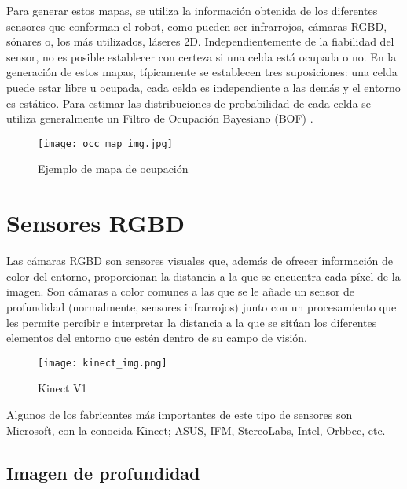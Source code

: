 Para generar estos mapas, se utiliza la información obtenida de los diferentes sensores que conforman el robot, como pueden ser infrarrojos, cámaras RGBD, sónares o, los más utilizados, láseres 2D. Independientemente de la fiabilidad del sensor, no es posible establecer con certeza si una celda está ocupada o no. En la generación de estos mapas, típicamente se establecen tres suposiciones: una celda puede estar libre u ocupada, cada celda es independiente a las demás y el entorno es estático. Para estimar las distribuciones de probabilidad de cada celda se utiliza generalmente un Filtro de Ocupación Bayesiano (BOF) \cite{occupancy_grid}.\\

\begin{figure}[h]
\begin{center} \label{fig:occ_map}
\texttt{[image: occ\_map\_img.jpg]}
\end{center}
\caption{Ejemplo de mapa de ocupación}
\end{figure}

\section{Sensores RGBD}

Las cámaras RGBD son sensores visuales que, además de ofrecer información de color del entorno, proporcionan la distancia a la que se encuentra cada píxel de la imagen. Son cámaras a color comunes a las que se le añade un sensor de profundidad (normalmente, sensores infrarrojos) junto con un procesamiento que les permite percibir e interpretar la distancia a la que se sitúan los diferentes elementos del entorno que estén dentro de su campo de visión.\\

\begin{figure}[h]
	\begin{center} 
		\texttt{[image: kinect\_img.png]}
	\end{center}
	\caption{Kinect V1}
	\label{fig:kinect}
\end{figure}

Algunos de los fabricantes más importantes de este tipo de sensores son Microsoft, con la conocida Kinect; ASUS, IFM, StereoLabs, Intel, Orbbec, etc.\\

\subsection{Imagen de profundidad}

